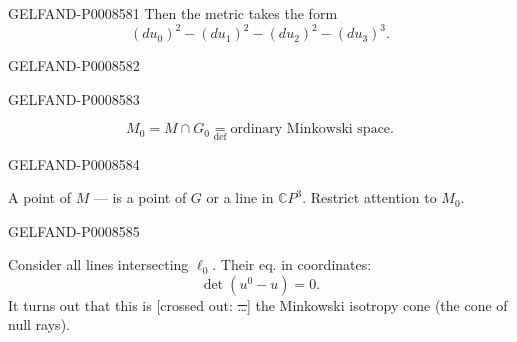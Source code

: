 \begin{GelfandAdjacentEvidence}{GELFAND-P000858}{1}
Then the metric takes the form
\[
(du_0)^2-(du_1)^2-(du_2)^2-(du_3)^3.\tag{25}
\]
\end{GelfandAdjacentEvidence}
\begin{GelfandAdjacentEvidence}{GELFAND-P000858}{2}

\end{GelfandAdjacentEvidence}
\begin{GelfandAdjacentEvidence}{GELFAND-P000858}{3}

\[
M_0=M\cap G_0\underset{\mathrm{def}}{=}\text{ordinary Minkowski space}.\tag{26}
\]
\end{GelfandAdjacentEvidence}
\begin{GelfandAdjacentEvidence}{GELFAND-P000858}{4}


A point of \(M\) — is a point of \(G\) or a line in \(\mathbb{C}P^3\).
Restrict attention to \(M_0\).
\end{GelfandAdjacentEvidence}
\begin{GelfandAdjacentEvidence}{GELFAND-P000858}{5}


Consider all lines intersecting \(\ell_0\).
Their eq. in coordinates:
\[
\det(u^0-u)=0.\tag{27}
\]
It turns out that this is [crossed out: \sout{…}] the Minkowski isotropy cone (the cone of null rays).
\end{GelfandAdjacentEvidence}
